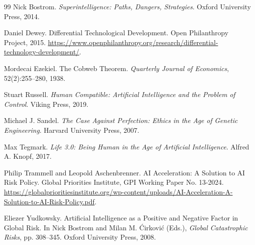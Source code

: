 \documentclass[11pt]{article}
\begin{document}
\begin{thebibliography}{99}
Nick Bostrom.
\newblock \emph{Superintelligence: Paths, Dangers, Strategies}.
\newblock Oxford University Press, 2014.

Daniel Dewey.
\newblock Differential Technological Development.
\newblock Open Philanthropy Project, 2015.
\newblock \url{https://www.openphilanthropy.org/research/differential-technology-development/}.

Mordecai Ezekiel.
\newblock The Cobweb Theorem.
\newblock \emph{Quarterly Journal of Economics}, 52(2):255--280, 1938.

Stuart Russell.
\newblock \emph{Human Compatible: Artificial Intelligence and the Problem of Control}.
\newblock Viking Press, 2019.

Michael J. Sandel.
\newblock \emph{The Case Against Perfection: Ethics in the Age of Genetic Engineering}.
\newblock Harvard University Press, 2007.

Max Tegmark.
\newblock \emph{Life 3.0: Being Human in the Age of Artificial Intelligence}.
\newblock Alfred A. Knopf, 2017.

Philip Trammell and Leopold Aschenbrenner.
\newblock AI Acceleration: A Solution to AI Risk Policy.
\newblock Global Priorities Institute, GPI Working Paper No. 13-2024.
\newblock \url{https://globalprioritiesinstitute.org/wp-content/uploads/AI-Acceleration-A-Solution-to-AI-Risk-Policy.pdf}.

Eliezer Yudkowsky.
\newblock Artificial Intelligence as a Positive and Negative Factor in Global Risk.
\newblock In Nick Bostrom and Milan M. Ćirković (Eds.), \emph{Global Catastrophic Risks}, pp. 308--345.
\newblock Oxford University Press, 2008.
\end{thebibliography}
\end{document}
